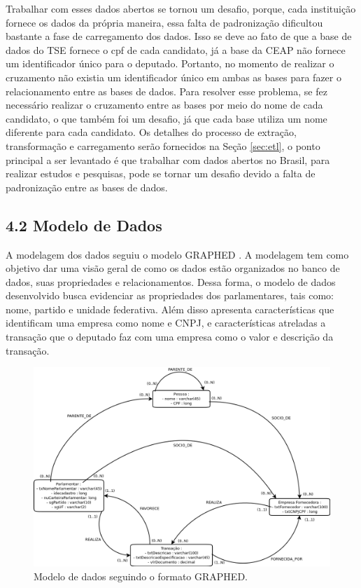 \documentclass[12pt]{article}
\begin{document}
	Trabalhar com esses dados abertos se tornou um desafio, porque, cada instituição fornece os dados da própria maneira, essa falta de padronização dificultou bastante a fase de carregamento dos dados. Isso se deve ao fato de que a base de dados do TSE fornece o cpf de cada candidato, já a base da CEAP não fornece um identificador único para o deputado. Portanto, no momento de realizar o cruzamento não existia um identificador único em ambas as bases para fazer o relacionamento entre as bases de dados. Para resolver esse problema, se fez necessário realizar o cruzamento entre as bases por meio do nome de cada candidato, o que também foi um desafio, já que cada base utiliza um nome diferente para cada candidato. Os detalhes do processo de extração, transformação e carregamento serão fornecidos na Seção \ref{sec:etl}, o ponto principal a ser levantado é que trabalhar com dados abertos no Brasil, para realizar estudos e pesquisas, pode se tornar um desafio devido a falta de padronização entre as bases de dados.
	
\subsection{4.2 Modelo de Dados} \label{sec:modelodados}

	A modelagem dos dados seguiu o modelo GRAPHED \cite{mdgnosql}. A modelagem tem como objetivo dar uma visão geral de como os dados estão organizados no banco de dados, suas propriedades e relacionamentos. Dessa forma, o modelo de dados desenvolvido busca evidenciar as propriedades dos parlamentares, tais como: nome, partido e unidade federativa. Além disso apresenta características que identificam uma empresa como nome e CNPJ, e características atreladas a transação que o deputado faz com uma empresa como o valor e descrição da transação.
	
\begin{figure}[ht]
\centering
\includegraphics[width=.79\textwidth]{CEAP-v3.png}
\caption{Modelo de dados seguindo o formato GRAPHED.}
\label{fig:modeloDeDados}
\end{figure}
\end{document}
